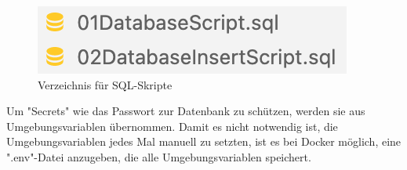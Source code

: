 \begin{figure}
    \centering
    \includegraphics{media/Docker/SQLScriptDir.png}
    \caption{Verzeichnis für SQL-Skripte}
    \label{fig:SQLScriptDir}
\end{figure}

Um "Secrets" wie das Passwort zur Datenbank zu schützen, werden sie aus Umgebungsvariablen übernommen.
Damit es nicht notwendig ist, die Umgebungsvariablen jedes Mal manuell zu setzten, ist es bei Docker möglich, eine ".env"-Datei anzugeben, die alle Umgebungsvariablen speichert. 

